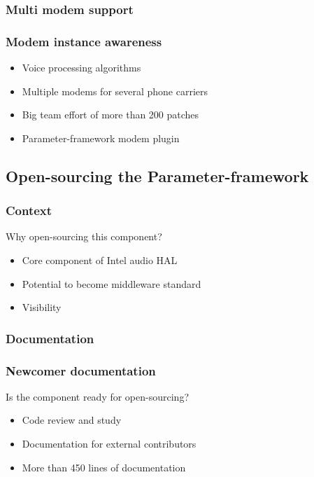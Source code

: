 
\subsubsection{Multi modem support}
\begin{frame}
    \frametitle{Modem instance awareness}
    \begin{itemize}
        \item Voice processing algorithms
        \item Multiple modems for several phone carriers
        \item Big team effort of more than 200 patches
        \item Parameter-framework modem plugin
    \end{itemize}
\end{frame}

\subsection{Open-sourcing the Parameter-framework}
\subsubsection{Context}
\begin{FrameWithSubSection}
    \begin{block}{Why open-sourcing this component?}
        \begin{itemize}
            \item Core component of Intel audio HAL
            \item Potential to become middleware standard
            \item Visibility
        \end{itemize}
    \end{block}
\end{FrameWithSubSection}

\subsubsection{Documentation}
\begin{frame}
    \frametitle{Newcomer documentation}
    \centering
    \begin{block}{Is the component ready for open-sourcing?}
        \begin{itemize}
            \item Code review and study
            \item Documentation for external contributors
            \item More than 450 lines of documentation
        \end{itemize}
    \end{block}
\end{frame}

